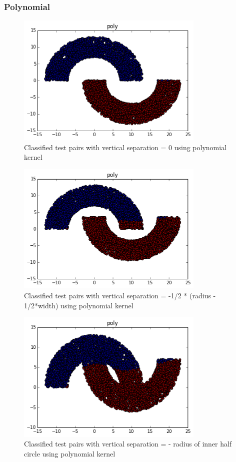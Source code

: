 \documentclass[paper=a4, fontsize=11pt]{scrartcl} %
\numberwithin{equation}{section} %
\numberwithin{figure}{section} %
\numberwithin{table}{section} %
\begin{document}
\subsubsection{Polynomial}
\begin{figure}[H]
	\centering
  \includegraphics[width=0.8\textwidth]{poly_1.png}
	\caption{Classified test pairs with vertical separation = 0 using polynomial kernel}
	\label{fig_poly1}
\end{figure}
\begin{figure}[H]
	\centering
  \includegraphics[width=0.8\textwidth]{poly_2.png}
	\caption{Classified test pairs with vertical separation = -1/2 * (radius - 1/2*width) using polynomial kernel}
	\label{fig_poly2}
\end{figure}
\begin{figure}[H]
	\centering
  \includegraphics[width=0.8\textwidth]{poly_3.png}
	\caption{Classified test pairs with vertical separation = - radius of inner half circle using polynomial kernel}
	\label{fig_poly3}
\end{figure}
\end{document}
